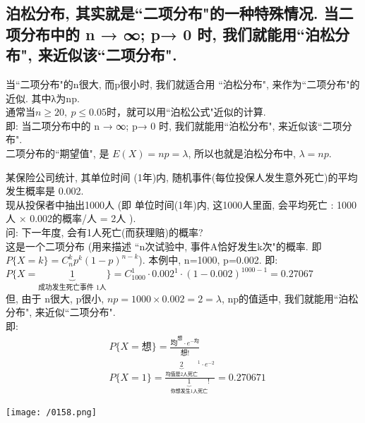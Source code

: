 \documentclass[UTF8]{ctexart}
\begin{document}
	
	
	
	
	\subsection{泊松分布, 其实就是``二项分布"的一种特殊情况. 当二项分布中的  n → ∞;   p→ 0 时, 我们就能用``泊松分布", 来近似该``二项分布".}
	
	当``二项分布"的n很大, 而p很小时, 我们就适合用 ``泊松分布", 来作为``二项分布"的近似.  其中λ为np. \\
	通常当$n \geq20, \ p \leq 0.05$时，就可以用``泊松公式"近似的计算. \\
	
	
	
	
	即: 当二项分布中的  n → ∞;   p→ 0 时, 我们就能用``泊松分布", 来近似该``二项分布". \\
	二项分布的``期望值", 是 $ E(X)=np=\lambda$, 所以也就是泊松分布中, $\lambda=np$. \\

	
	
	
	\begin{myEnvSample}
		某保险公司统计, 其单位时间 (1年)内, 随机事件(每位投保人发生意外死亡)的平均发生概率是 0.002. \\
		现从投保者中抽出1000人 (即 单位时间(1年)内, 这1000人里面, 会平均死亡 : 1000人 × 0.002的概率/人 = 2人 ). \\
		问: 下一年度, 会有1人死亡(而获理赔)的概率? \\
		
		这是一个二项分布 (用来描述 ``n次试验中, 事件A恰好发生k次"的概率. 即 $P\{X=k\}=C_{n}^{k}p^k(1-p)^{n-k}$). 本例中, n=1000, p=0.002. 即:\\
		$
		P\{X=\underset{\text{成功发生死亡事件\ 1人}}{\underbrace{1}}\}=C_{1000}^{1}\cdot 0.002^1\cdot (1-0.002)^{1000-1}=0.27067
		$ \\
		
		但, 由于 n很大, p很小, $np=1000×0.002=2=\lambda$, np的值适中, 我们就能用``泊松分布", 来近似``二项分布". \\
		即:
		\begin{align*}  %
			&P\{X=\text{想\}}=\frac{\text{均}^{\text{想}}\cdot e^{-\text{均}}}{\text{想!}}\\
			&P\{X=1\}=\frac{\underset{\text{均值是2人死亡}}{\underbrace{2}}^1\cdot e^{-2}}{\underset{\text{你想发生1人死亡}}{\underbrace{1}}!}=0.270671
		\end{align*}
		
		\texttt{[image: /0158.png]} 
	\end{myEnvSample}
	\vspace{1em} 
	
\end{document}
